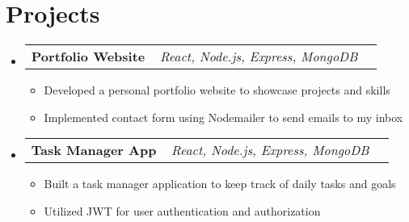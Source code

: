 \documentclass[letterpaper,11pt]{article}
\makeatletter
\newcommand{\resumeItem}[1]{
  \item\small{
    {#1 \vspace{-2pt}}
  }
}
\newcommand{\resumeProjectHeading}[2]{
  \item
  \begin{tabular*}{0.97\textwidth}{l@{\extracolsep{\fill}}r}
    \small#1 & #2 \\
  \end{tabular*}\vspace{-7pt}
}
\newcommand{\resumeSubHeadingListStart}{\begin{itemize}[leftmargin=0.15in, label={}]}
\newcommand{\resumeSubHeadingListEnd}{\end{itemize}}
\newcommand{\resumeItemListStart}{\begin{itemize}}
\newcommand{\resumeItemListEnd}{\end{itemize}\vspace{-5pt}}
\makeatother
\begin{document}
\section{Projects}
  \resumeSubHeadingListStart
    \resumeProjectHeading
      {\textbf{Portfolio Website} ~ \emph{React, Node.js, Express, MongoDB}}{}
    \resumeItemListStart
      \resumeItem{Developed a personal portfolio website to showcase projects and skills}
			\resumeItem{Implemented contact form using Nodemailer to send emails to my inbox}
    \resumeItemListEnd
\resumeProjectHeading
      {\textbf{Task Manager App} ~ \emph{React, Node.js, Express, MongoDB}}{}
    \resumeItemListStart
      \resumeItem{Built a task manager application to keep track of daily tasks and goals}
			\resumeItem{Utilized JWT for user authentication and authorization}
    \resumeItemListEnd
  \resumeSubHeadingListEnd

\end{document}
